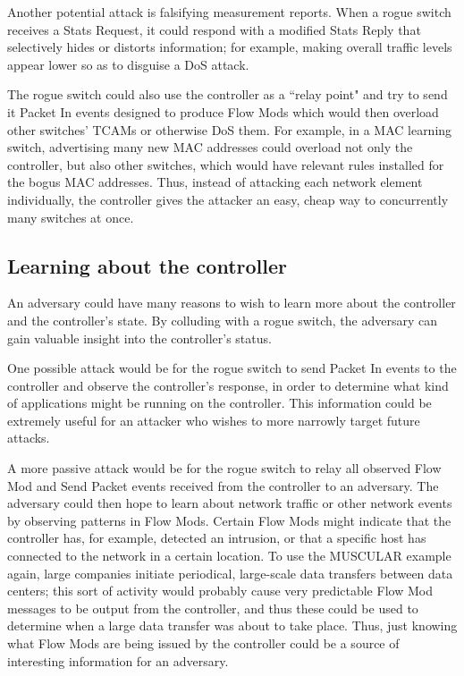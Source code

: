 Another potential attack is falsifying measurement reports. When a rogue switch receives a Stats Request, it could respond with a modified Stats Reply that selectively hides or distorts information; for example, making overall traffic levels appear lower so as to disguise a DoS attack. 

The rogue switch could also use the controller as a ``relay point" and try to send it Packet In events designed to produce Flow Mods which would then overload other switches' TCAMs or otherwise DoS them. For example, in a MAC learning switch, advertising many new MAC addresses could overload not only the controller, but also other switches, which would have relevant rules installed for the bogus MAC addresses. Thus, instead of attacking each network element individually, the controller gives the attacker an easy, cheap way to concurrently many switches at once. 

\subsection{Learning about the controller}
An adversary could have many reasons to wish to learn more about the controller and the controller's state. By colluding with a rogue switch, the adversary can gain valuable insight into the controller's status.

One possible attack would be for the rogue switch to send Packet In events to the controller and observe the controller's response, in order to determine what kind of applications might be running on the controller. This information could be extremely useful for an attacker who wishes to more narrowly target future attacks.

A more passive attack would be for the rogue switch to relay all observed Flow Mod and Send Packet events received from the controller to an adversary. The adversary could then hope to learn about network traffic or other network events by observing patterns in Flow Mods. Certain Flow Mods might indicate that the controller has, for example, detected an intrusion, or that a specific host has connected to the network in a certain location. To use the MUSCULAR example again, large companies initiate periodical, large-scale data transfers between data centers; this sort of activity would probably cause very predictable Flow Mod messages to be output from the controller, and thus these could be used to determine when a large data transfer was about to take place. Thus, just knowing what Flow Mods are being issued by the controller could be a source of interesting information for an adversary.

